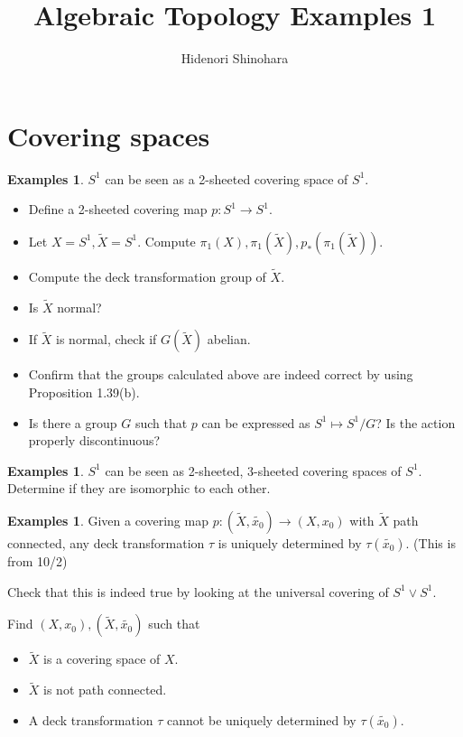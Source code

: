 \documentclass[12pt, psamsfonts]{amsart}
\theoremstyle{definition}
\newtheorem{exmps}[thm]{Examples}
\theoremstyle{remark}
\numberwithin{equation}{section}
\begin{document}
\title{Algebraic Topology Examples 1}
\author{Hidenori Shinohara}
\maketitle

\section{Covering spaces}

\begin{exmps}
  $S^1$ can be seen as a 2-sheeted covering space of $S^1$.
  \begin{itemize}
    \item
      Define a 2-sheeted covering map $p: S^1 \rightarrow S^1$.
    \item
      Let $X = S^1, \tilde{X} = S^1$.
      Compute $\pi_1(X), \pi_1(\tilde{X}), p_*(\pi_1(\tilde{X}))$.
    \item
      Compute the deck transformation group of $\tilde{X}$.
    \item
      Is $\tilde{X}$ normal?
    \item
      If $\tilde{X}$ is normal, check if $G(\tilde{X})$ abelian.
    \item
      Confirm that the groups calculated above are indeed correct by using Proposition 1.39(b). 
    \item
      Is there a group $G$ such that $p$ can be expressed as $S^1 \mapsto S^1 / G$?
      Is the action properly discontinuous?
  \end{itemize}
\end{exmps}

\begin{exmps}
  $S^1$ can be seen as 2-sheeted, 3-sheeted covering spaces of $S^1$.
  Determine if they are isomorphic to each other.
\end{exmps}

\begin{exmps}
  Given a covering map $p: (\tilde{X}, \tilde{x_0}) \rightarrow (X, x_0)$ with $\tilde{X}$ path connected, any deck transformation $\tau$ is uniquely determined by $\tau(\tilde{x_0})$.
  (This is from 10/2)

  Check that this is indeed true by looking at the universal covering of $S^1 \vee S^1$.

  Find $(X, x_0), (\tilde{X}, \tilde{x_0})$ such that
  \begin{itemize}
    \item
      $\tilde{X}$ is a covering space of $X$.
    \item
      $\tilde{X}$ is not path connected.
    \item
      A deck transformation $\tau$ cannot be uniquely determined by $\tau(\tilde{x_0})$.
  \end{itemize}
\end{exmps}
\end{document}

